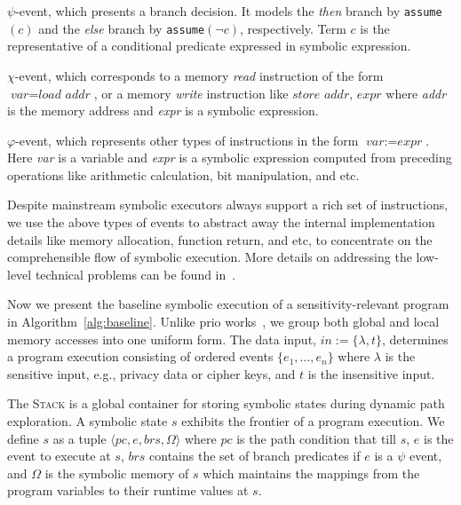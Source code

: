 \documentclass[sigconf, review]{acmart}
\newcommand{\textcode}[1]{\texttt{#1}}
\newcommand{\pcon}{\mathit{pc}}
\begin{document}
\begin{itemize*}
  \item $\psi$-event, which presents a branch decision. It models the 
    \textit{then} branch by \textcode{assume$(c)$} and the \textit{else} 
    branch by \textcode{assume$(\neg c)$}, respectively. Term $\textit{c}$ 
    is the representative of a conditional predicate expressed in symbolic 
    expression. 

  \item $\chi$-event, which corresponds to a memory \textit{read} instruction 
    of the form $\textit{var}=\textit{load~addr}$, or a memory \textit{write} 
    instruction like $\textit{store~addr, expr}$ where \textit{addr} is the 
    memory address and \textit{expr} is a symbolic expression.

  \item $\varphi$-event, which represents other types of instructions in the 
    form $\textit{var}:=\textit{expr}$. Here \textit{var} is a variable and 
    \textit{expr} is a symbolic expression computed from preceding operations 
    like arithmetic calculation, bit manipulation, and etc.
\end{itemize*}


Despite mainstream symbolic executors always support a rich set of instructions, 
we use the above types of events to abstract away the internal implementation 
details like memory allocation, function return, and etc, to concentrate on the 
comprehensible flow of symbolic execution. More details on addressing the low-level
technical problems can be found in~\cite{CadarDE08,PasareanuR10,CiorteaZBCC09}.


Now we present the baseline symbolic execution of a sensitivity-relevant program 
in Algorithm~\ref{alg:baseline}. Unlike prio works~\cite{GuoKWYG15,GuoWW18}, 
we group both global and local memory accesses into one uniform form. The data 
input, $\mathit{in}:=\{\lambda,t\}$, determines a program execution consisting 
of ordered events $\{e_1,\ldots,e_n\}$ where $\mathit{\lambda}$ is the sensitive 
input, e.g., privacy data or cipher keys, and $\mathit{t}$ is the insensitive 
input.


The \textsc{Stack} is a global container for storing symbolic states during 
dynamic path exploration. A symbolic state $\mathit{s}$ exhibits the frontier 
of a program execution. We define $\mathit{s}$ as a tuple $\langle \pcon, 
\mathit{e}, \mathit{brs}, \Omega \rangle$ where $\pcon$ is the path condition 
that till $\mathit{s}$, $\mathit{e}$ is the event to execute at $\mathit{s}$, 
$\mathit{brs}$ contains the set of branch predicates if $\mathit{e}$ is a $\psi$ 
event, and $\Omega$ is the symbolic memory of $\mathit{s}$ which maintains the
mappings from the program variables to their runtime values at $\mathit{s}$.
\end{document}
